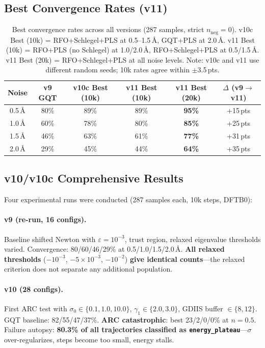 \documentclass[11pt,a4paper]{article}
\theoremstyle{definition}
\begin{document}
\subsection{Best Convergence Rates (v11)}
\label{sec:best-rates}

\begin{table}[h]
\centering
\begin{tabular}{cccccc}
\toprule
Noise & v9 GQT & v10c Best (10k) & v11 Best (10k) & v11 Best (20k) & $\Delta$ (v9$\to$v11) \\
\midrule
0.5\,\AA & 80\% & 89\% & 89\% & \textbf{95\%} & +15\,pts \\
1.0\,\AA & 60\% & 78\% & 80\% & \textbf{85\%} & +25\,pts \\
1.5\,\AA & 46\% & 63\% & 61\% & \textbf{77\%} & +31\,pts \\
2.0\,\AA & 29\% & 45\% & 44\% & \textbf{64\%} & +35\,pts \\
\bottomrule
\end{tabular}
\caption{Best convergence rates across all versions (287 samples, strict $n_\text{neg}=0$).
  v10c Best (10k) = RFO+Schlegel+PLS at 0.5--1.5\,\AA, GQT+PLS at 2.0\,\AA.
  v11 Best (10k) = RFO+PLS (no Schlegel) at 1.0/2.0\,\AA, RFO+Schlegel+PLS at 0.5/1.5\,\AA.
  v11 Best (20k) = RFO+Schlegel+PLS at all noise levels.
  Note: v10c and v11 use different random seeds; 10k rates agree within $\pm$3.5\,pts.}
\label{tab:best-rates}
\end{table}

\subsection{v10/v10c Comprehensive Results}
\label{sec:v10-results}

Four experimental runs were conducted (287 samples each, 10k steps, DFTB0):

\paragraph{v9 (re-run, 16 configs).}
Baseline shifted Newton with $\varepsilon=10^{-3}$, trust region,
relaxed eigenvalue thresholds varied.
Convergence: 80/60/46/29\% at 0.5/1.0/1.5/2.0\,\AA.
\textbf{All relaxed thresholds} ($-10^{-3}$, $-5\times10^{-3}$, $-10^{-2}$)
\textbf{give identical counts}---the relaxed criterion does not separate
any additional population.

\paragraph{v10 (28 configs).}
First ARC test with $\sigma_0 \in \{0.1, 1.0, 10.0\}$,
$\gamma_1 \in \{2.0, 3.0\}$, GDIIS buffer $\in \{8, 12\}$.
GQT baseline: 82/55/47/37\%.
\textbf{ARC catastrophic}: best 23/2/0/0\% at $n=0.5$.
Failure autopsy: \textbf{80.3\% of all trajectories classified as
\texttt{energy\_plateau}}---$\sigma$ over-regularizes, steps become
too small, energy stalls.
\end{document}
